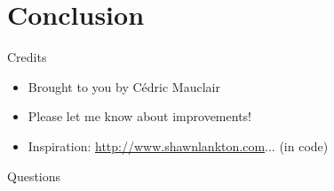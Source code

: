 \documentclass[utf8, a4paper]{beamer}
\begin{document}
\section
  {Conclusion}

\begin{frame}
  {Credits}

  \begin{itemize}
  \item Brought to you by Cédric Mauclair
  \item Please let me know about improvements!
  \item Inspiration: \url{http://www.shawnlankton.com}... (in code)
  \end{itemize}
\end{frame}


\begin{frame}
  {Questions}

  \nocite{lorem,ipsum}
  
  

\end{frame}
\end{document}
